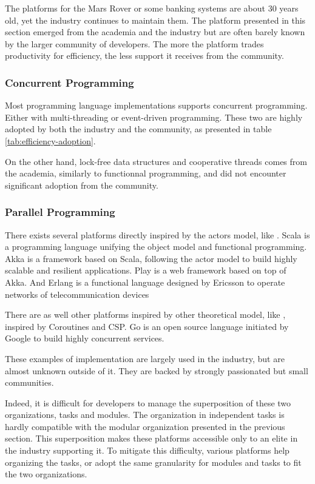The platforms for the Mars Rover or some banking systems are about 30 years old, yet the industry continues to maintain them.
The platform presented in this section emerged from the academia and the industry but are often barely known by the larger community of developers.
The more the platform trades productivity for efficiency, the less support it receives from the community.


\subsubsection{Concurrent Programming}

Most programming language implementations supports concurrent programming.
Either with multi-threading or event-driven programming.
These two are highly adopted by both the industry and the community, as presented in table \ref{tab:efficiency-adoption}.

On the other hand, lock-free data structures and cooperative threads comes from the academia, similarly to functionnal programming, and did not encounter significant adoption from the community.

\subsubsection{Parallel Programming}

There exists several platforms directly inspired by the actors model, like .
Scala is a programming language unifying the object model and functional programming.
Akka is a framework based on Scala, following the actor model to build highly scalable and resilient applications.
Play is a web framework based on top of Akka.
And Erlang is a functional language designed by Ericsson to operate networks of telecommunication devices \cite{Armstrong1993,Nelson2004,Armstrong2014}

There are as well other platforms inspired by other theoretical model, like , inspired by Coroutines and CSP.
Go is an open source language initiated by Google to build highly concurrent services.

These examples of implementation are largely used in the industry, but are almost unknown outside of it.
They are backed by strongly passionated but small communities.

Indeed, it is difficult for developers to manage the superposition of these two organizations, tasks and modules.
The organization in independent tasks is hardly compatible with the modular organization presented in the previous section.
This superposition makes these platforms accessible only to an elite in the industry supporting it.
To mitigate this difficulty, various platforms help organizing the tasks, or adopt the same granularity for modules and tasks to fit the two organizations.

